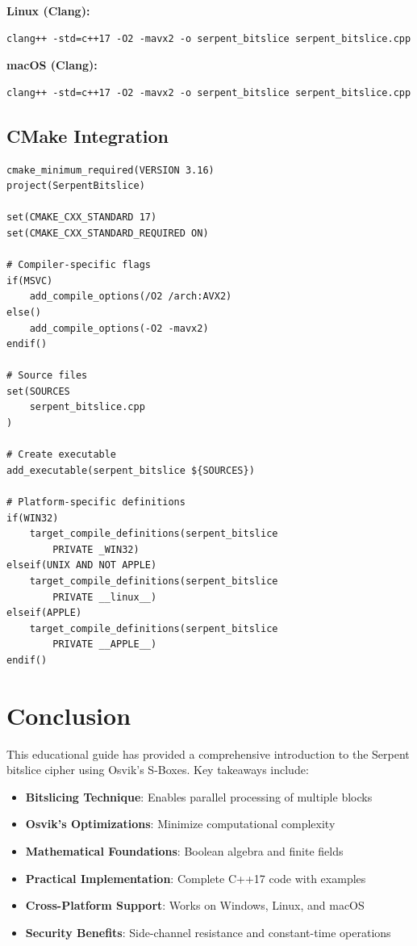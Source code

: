 \documentclass[12pt,a4paper]{article}
\begin{document}
\textbf{Linux (Clang):}
\begin{verbatim}
clang++ -std=c++17 -O2 -mavx2 -o serpent_bitslice serpent_bitslice.cpp
\end{verbatim}

\textbf{macOS (Clang):}
\begin{verbatim}
clang++ -std=c++17 -O2 -mavx2 -o serpent_bitslice serpent_bitslice.cpp
\end{verbatim}

\subsection{CMake Integration}

\begin{lstlisting}[caption=CMakeLists.txt for Serpent Bitslice, 
    basicstyle=\ttfamily\scriptsize,
    columns=flexible,
    basewidth=0.4em,
    breaklines=true,
    breakatwhitespace=true]
cmake_minimum_required(VERSION 3.16)
project(SerpentBitslice)

set(CMAKE_CXX_STANDARD 17)
set(CMAKE_CXX_STANDARD_REQUIRED ON)

# Compiler-specific flags
if(MSVC)
    add_compile_options(/O2 /arch:AVX2)
else()
    add_compile_options(-O2 -mavx2)
endif()

# Source files
set(SOURCES
    serpent_bitslice.cpp
)

# Create executable
add_executable(serpent_bitslice ${SOURCES})

# Platform-specific definitions
if(WIN32)
    target_compile_definitions(serpent_bitslice 
        PRIVATE _WIN32)
elseif(UNIX AND NOT APPLE)
    target_compile_definitions(serpent_bitslice 
        PRIVATE __linux__)
elseif(APPLE)
    target_compile_definitions(serpent_bitslice 
        PRIVATE __APPLE__)
endif()
\end{lstlisting}

\section{Conclusion}

This educational guide has provided a comprehensive introduction to the Serpent bitslice cipher using Osvik's S-Boxes. Key takeaways include:

\begin{itemize}
    \item \textbf{Bitslicing Technique}: Enables parallel processing of multiple blocks
    \item \textbf{Osvik's Optimizations}: Minimize computational complexity
    \item \textbf{Mathematical Foundations}: Boolean algebra and finite fields
    \item \textbf{Practical Implementation}: Complete C++17 code with examples
    \item \textbf{Cross-Platform Support}: Works on Windows, Linux, and macOS
    \item \textbf{Security Benefits}: Side-channel resistance and constant-time operations
\end{itemize}
\end{document}
